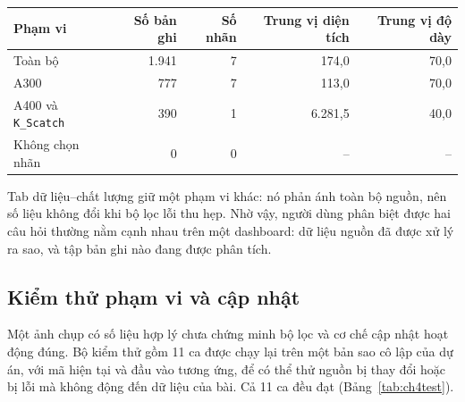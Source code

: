 \documentclass[12pt,a4paper,oneside]{report}
\newcommand{\maCot}[1]{{\urlstyle{tt}\def\UrlBreaks{\do\_\do\/\do\.}\def\UrlBigBreaks{}\nolinkurl{#1}}}
\begin{document}
\begin{center}\begin{minipage}{\linewidth}
\label{tab:ch4kpi}
\small{}
\begin{tabularx}{\linewidth}{@{}Y r r r r@{}}
\toprule
Phạm vi & Số bản ghi & Số nhãn & Trung vị diện tích & Trung vị độ dày \\
\midrule
Toàn bộ & 1.941 & 7 & 174,0 & 70,0 \\
A300 & 777 & 7 & 113,0 & 70,0 \\
A400 và \maCot{K_Scatch} & 390 & 1 & 6.281,5 & 40,0 \\
Không chọn nhãn & 0 & 0 & -- & -- \\
\bottomrule
\end{tabularx}
\end{minipage}\end{center}

Tab dữ liệu--chất lượng giữ một phạm vi khác: nó phản ánh toàn bộ nguồn, nên số liệu không đổi khi bộ lọc lỗi thu hẹp. Nhờ vậy, người dùng phân biệt được hai câu hỏi thường nằm cạnh nhau trên một dashboard: dữ liệu nguồn đã được xử lý ra sao, và tập bản ghi nào đang được phân tích.

\subsection{Kiểm thử phạm vi và cập nhật}

Một ảnh chụp có số liệu hợp lý chưa chứng minh bộ lọc và cơ chế cập nhật hoạt động đúng. Bộ kiểm thử gồm 11 ca được chạy lại trên một bản sao cô lập của dự án, với mã hiện tại và đầu vào tương ứng, để có thể thử nguồn bị thay đổi hoặc bị lỗi mà không động đến dữ liệu của bài. Cả 11 ca đều đạt (Bảng~\ref{tab:ch4test}).
\end{document}
